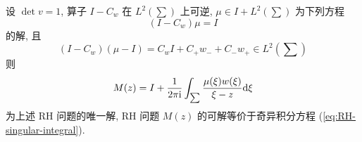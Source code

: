 \begin{theorem}
  设 $ \det v = 1 $, 算子 $ I - C_{w} $ 在 $ L^{2}(\sum) $ 上可逆, $ \mu \in I +L^{2}(\sum) $ 为下列方程
  \begin{equation}
    (I - C_{w}) \mu = I \label{eq:RH-singular-integral} %
  \end{equation}
  的解, 且 
  \begin{equation}
    (I -C_{w})(\mu - I) = C_{w}I + C_{+}w_{-} + C_{-}w_{+} \in L^{2}(\sum) 
  \end{equation}
  则 
  \begin{equation}
    M(z) = I + \frac{1}{2 \pi \mathrm{i}} \int_{\sum} \frac{\mu(\xi) w(\xi)}{\xi - z} \mathrm{d} \xi \label{eq:RH-singular-integral-matrix}
  \end{equation}
  为上述 RH 问题的唯一解, RH 问题 $ M(z) $ 的可解等价于奇异积分方程 (\ref{eq:RH-singular-integral}).
\end{theorem}
